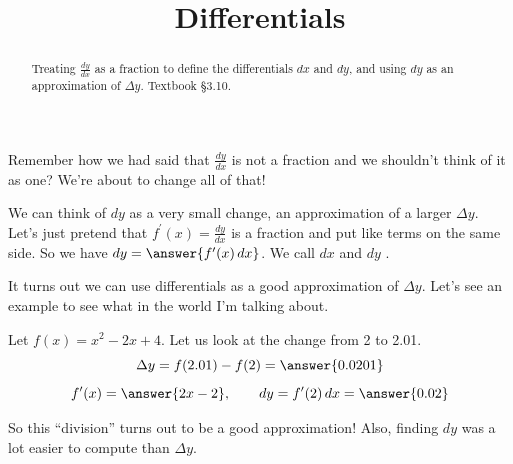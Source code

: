 \documentclass{ximera}
\title{Differentials}
\begin{document}
\begin{abstract}
Treating $\frac{dy}{dx}$ as a fraction to define the differentials $dx$ and $dy$, and using $dy$ as an approximation of $\Delta y$. Textbook §3.10.
\end{abstract}
\maketitle

Remember how we had said that $\frac{d y}{d x}$ is not a fraction and we shouldn't think of it as one? We're about to change all of that!

We can think of $d y$ as a very small change, an approximation of a larger $\Delta y$. Let's just pretend that $f^{\prime}(x)=\frac{d y}{d x}$ is a fraction and put like terms on the same side. So we have $dy=\answer{f^{\prime}(x)\,dx}$. We call $d x$ and $d y$ .

It turns out we can use differentials as a good approximation of $\Delta y$. Let's see an example to see what in the world I'm talking about.

\begin{example}\label{example:9-1}
Let $f(x)=x^{2}-2 x+4$. Let us look at the change from 2 to 2.01.
\[
\Delta y=f(2.01)-f(2)=\answer{0.0201}
\]
\[
f^{\prime}(x)=\answer{2x-2}, \qquad dy=f^{\prime}(2)\,dx=\answer{0.02}
\]
\end{example}

So this ``division'' turns out to be a good approximation! Also, finding $d y$ was a lot easier to compute than $\Delta y$.
\end{document}
